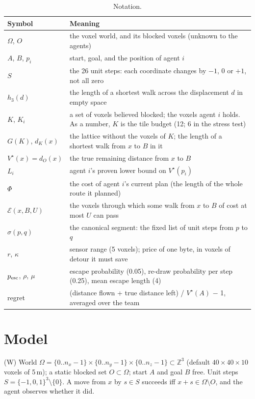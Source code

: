 \documentclass[11pt,a4paper]{article}
\newcommand{\Vs}{V^\star}
\newcommand{\E}{\mathcal E}
\begin{document}
\begin{table}[htbp]\centering\small
\begin{tabularx}{\linewidth}{>{\raggedright\arraybackslash}p{3.2cm}L}
\toprule
Symbol & Meaning \\
\midrule
$\Omega$, $O$ & the voxel world, and its blocked voxels (unknown to the agents) \\
$A$, $B$, $p_i$ & start, goal, and the position of agent $i$ \\
$S$ & the 26 unit steps: each coordinate changes by $-1$, $0$ or $+1$, not all zero \\
$h_3(d)$ & the length of a shortest walk across the displacement $d$ in empty space \\
$K$, $K_i$ & a set of voxels believed blocked; the voxels agent $i$ holds. As a number, $K$ is the tile budget
(12; 6 in the stress test) \\
$G(K)$, $d_K(x)$ & the lattice without the voxels of $K$; the length of a shortest walk from $x$ to $B$ in it \\
$\Vs(x)=d_O(x)$ & the true remaining distance from $x$ to $B$ \\
$L_i$ & agent $i$'s proven lower bound on $\Vs(p_i)$ \\
$\Phi$ & the cost of agent $i$'s current plan (the length of the whole route it planned) \\
$\E(x,B,U)$ & the voxels through which some walk from $x$ to $B$ of cost at most $U$ can pass \\
$\sigma(p,q)$ & the canonical segment: the fixed list of unit steps from $p$ to $q$ \\
$r$, $\kappa$ & sensor range (5 voxels); price of one byte, in voxels of detour it must save \\
$p_{\rm esc}$, $\rho$, $\mu$ & escape probability (0.05), re-draw probability per step (0.25), mean escape length (4) \\
regret & (distance flown + true distance left) / $\Vs(A)$ $-$ 1, averaged over the team \\
\bottomrule
\end{tabularx}
\caption{Notation.}\label{tab:notation}
\end{table}

\section{Model}\label{sec:model}

\begin{defn}{(W) World}
$\Omega=\{0..n_x-1\}\times\{0..n_y-1\}\times\{0..n_z-1\}\subset\mathbb Z^3$ (default $40\times40\times10$ voxels of
5\,m); a static blocked set $O\subset\Omega$; start $A$ and goal $B$ free. Unit steps $S=\{-1,0,1\}^3\setminus\{0\}$. A
move from $x$ by $s\in S$ succeeds iff $x+s\in\Omega\setminus O$, and the agent observes whether it did.
\end{defn}
\end{document}
